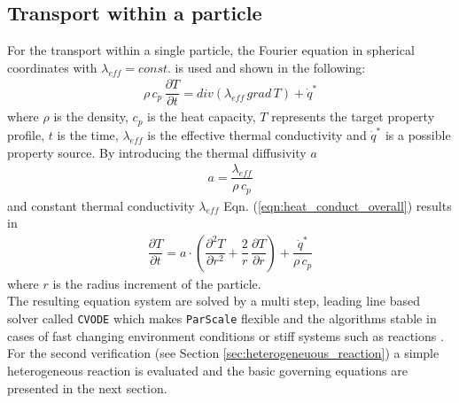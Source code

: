 \documentclass{particles2015}
\begin{document}
\subsection{Transport within a particle}
For the transport within a single particle, the Fourier equation in spherical coordinates with $\lambda_{eff} = const.$ is used and shown in the following:
\begin{align}
\rho \, c_p \, \dfrac{\partial T}{\partial t} = div (\lambda_{eff}\, grad\,T) + \dot{q}^{\ast}
\label{eqn:heat_conduct_overall}
\end{align}
where $\rho$ is the density, $c_p$ is the heat capacity, $T$ represents the target property profile, $t$ is the time, $\lambda_{eff}$ is the effective thermal conductivity and $\dot{q}^{\ast}$ is a possible property source. By introducing the thermal diffusivity $a$ 
\begin{align}
a = \dfrac{\lambda_{eff}}{\rho \, c_p}
\end{align}
and constant thermal conductivity $\lambda_{eff}$ Eqn. (\ref{eqn:heat_conduct_overall}) results in
\begin{align}
 \dfrac{\partial T}{\partial t} =  a \cdot \left( \dfrac{\partial^2 T}{\partial r^2} + \dfrac{2}{r} \, \dfrac{\partial T}{\partial r} \right) + \dfrac{\dot{q}^{\ast}}{\rho \, c_p}
\label{eqn:heatconductradial}
\end{align}
where $r$ is the radius increment of the particle.\\
The resulting equation system are solved by a multi step, leading line based solver called \texttt{CVODE} which makes \texttt{ParScale} flexible and the algorithms stable in cases of fast changing environment conditions or stiff systems such as reactions \cite{Cohen1996}. For the second verification (see Section \ref{sec:heterogeneuous_reaction}) a simple heterogeneous reaction is evaluated and the basic governing equations are presented in the next section.
\end{document}
